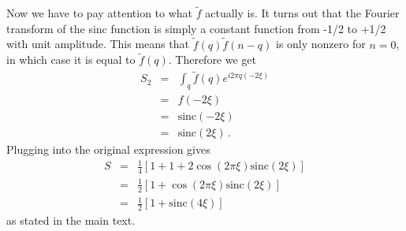 Now we have to pay attention to what $\tilde{f}$ actually is.
It turns out that the Fourier transform of the sinc function is simply a constant function from -1/2 to +1/2 with unit amplitude.
This means that $\tilde{f}(q)\tilde{f}(n-q)$ is only nonzero for $n=0$, in which case it is equal to $\tilde{f}(q)$.
Therefore we get
\begin{eqnarray*}
  S_2
  & = & \int_{q}\tilde{f}(q)e^{i2\pi q(-2\xi)}\\
  & = & f(-2\xi)\\
  & = & \textrm{sinc}(-2\xi)\\
  & = & \textrm{sinc}(2\xi)
  \, .
\end{eqnarray*}
Plugging into the original expression gives
\begin{eqnarray*}
  S
  & = & \frac{1}{4}\left[1+1+2\cos(2\pi\xi)\textrm{sinc}(2\xi)\right]\\
  & = & \frac{1}{2}\left[1+\cos(2\pi\xi)\textrm{sinc}(2\xi)\right]\\
  & = & \frac{1}{2}\left[1+\textrm{sinc}(4\xi)\right]
\end{eqnarray*}
as stated in the main text.
